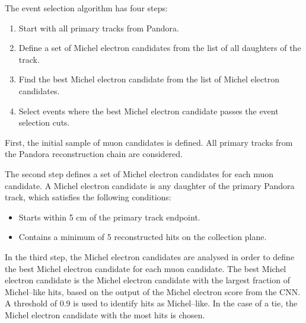 The event selection algorithm has four steps:
\begin{enumerate}
	\item Start with all primary tracks from Pandora.
	\item Define a set of Michel electron candidates from the list of all
		daughters of the track.
	\item Find the best Michel electron candidate from the list of Michel electron
		candidates.
	\item Select events where the best Michel electron candidate passes the event
		selection cuts.
\end{enumerate}

First, the initial sample of muon candidates is defined. All primary tracks 
from the Pandora reconstruction chain are considered.

The second step defines a set of Michel electron candidates for each muon
candidate. A Michel electron candidate is any daughter of the primary Pandora
track, which satisfies the following conditions:
\begin{itemize}
	\item Starts within 5 cm of the primary track endpoint.
	\item Contains a minimum of 5 reconstructed hits on the collection plane.
\end{itemize}

In the third step, the Michel electron candidates are analysed in order to 
define the best Michel electron candidate for each muon candidate. The best 
Michel electron candidate is the Michel electron candidate with the largest 
fraction of Michel--like hits, based on the output of the Michel electron score 
from the CNN. A threshold of 0.9 is used to identify hits as Michel--like. In 
the case of a tie, the Michel electron candidate with the most hits is chosen.

